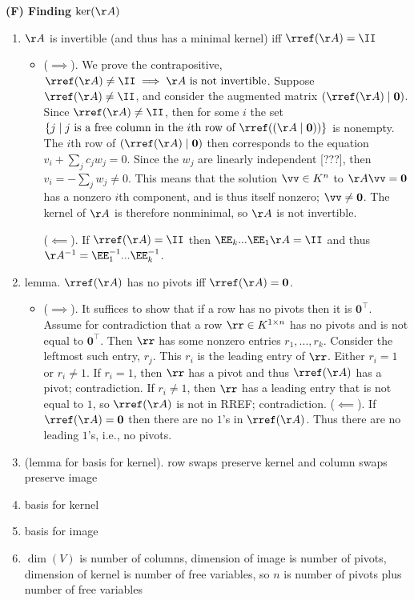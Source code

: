 \textbf{(F) Finding $\ker(\AA)$}
\begin{enumerate}    
    \item $\AA$ is invertible (and thus has a minimal kernel) iff $\rref(\AA) = \II$
    \begin{itemize}
        \item    
        ($\implies$). We prove the contrapositive, $\rref(\AA) \neq \II \implies \text{$\AA$ is not invertible}$. Suppose $\rref(\AA) \neq \II$, and consider the augmented matrix $(\rref(\AA) \mid \mathbf{0})$. Since $\rref(\AA) \neq \II$, then for some $i$ the set $\{j \mid \text{$j$ is a free column in the $i$th row of $\rref((\AA \mid \mathbf{0}))$}\}$ is nonempty. The $i$th row of $(\rref(\AA) \mid \mathbf{0})$ then corresponds to the equation $v_i + \sum_j c_j w_j = 0$. Since the $w_j$ are linearly independent [???], then $v_i = -\sum_j w_j \neq 0$. This means that the solution $\vv \in K^n$ to $\AA \vv = \mathbf{0}$ has a nonzero $i$th component, and is thus itself nonzero; $\vv \neq \mathbf{0}$. The kernel of $\AA$ is therefore nonminimal, so $\AA$ is not invertible. 

        ($\impliedby$). If $\rref(\AA) = \II$ then $\EE_k ... \EE_1 \AA = \II$ and thus $\AA^{-1} = \EE_1^{-1} ... \EE_k^{-1}$.
    \end{itemize}
    \item lemma. $\rref(\AA)$ has no pivots iff $\rref(\AA) = \mathbf{0}$.
    \begin{itemize}
        \item ($\implies$). It suffices to show that if a row has no pivots then it is $\mathbf{0}^\top$. Assume for contradiction that a row $\rr \in K^{1 \times n}$ has no pivots and is not equal to $\mathbf{0}^\top$. Then $\rr$ has some nonzero entries $r_1, ..., r_k$. Consider the leftmost such entry, $r_j$. This $r_i$ is the leading entry of $\rr$. Either $r_i = 1$ or $r_i \neq 1$. If $r_i = 1$, then $\rr$ has a pivot and thus $\rref(\AA)$ has a pivot; contradiction. If $r_i \neq 1$, then $\rr$ has a leading entry that is not equal to $1$, so $\rref(\AA)$ is not in RREF; contradiction. 
        ($\impliedby$). If $\rref(\AA) = \mathbf{0}$ then there are no $1$'s in $\rref(\AA)$. Thus there are no leading $1$'s, i.e., no pivots.
    \end{itemize}
    \item (lemma for basis for kernel). row swaps preserve kernel and column swaps preserve image
    \item basis for kernel
    \item basis for image
    \item $\dim(V)$ is number of columns, dimension of image is number of pivots, dimension of kernel is number of free variables, so $n$ is number of pivots plus number of free variables
\end{enumerate}

